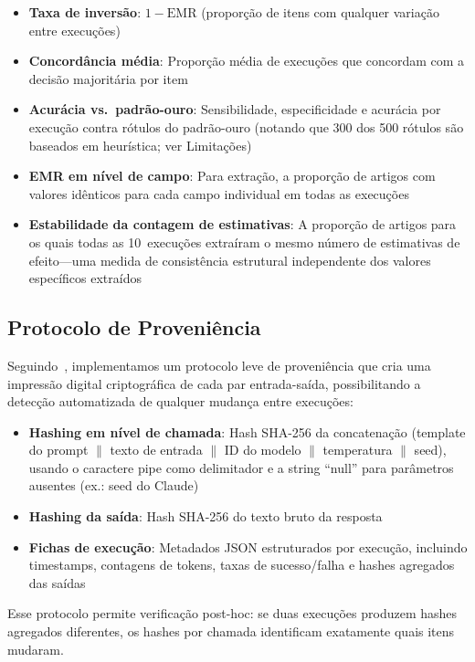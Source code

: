 \documentclass[12pt, a4paper]{article}
\newcommand{\emr}{\textrm{EMR}}
\begin{document}
\begin{itemize}
  \item \textbf{Taxa de inversão}: $1 - \emr$ (proporção de itens com qualquer variação entre execuções)
  \item \textbf{Concordância média}: Proporção média de execuções que concordam com a decisão majoritária por item
  \item \textbf{Acurácia vs.\ padrão-ouro}: Sensibilidade, especificidade e acurácia por execução contra rótulos do padrão-ouro (notando que 300 dos 500 rótulos são baseados em heurística; ver Limitações)
  \item \textbf{EMR em nível de campo}: Para extração, a proporção de artigos com valores idênticos para cada campo individual em todas as execuções
  \item \textbf{Estabilidade da contagem de estimativas}: A proporção de artigos para os quais todas as 10~execuções extraíram o mesmo número de estimativas de efeito---uma medida de consistência estrutural independente dos valores específicos extraídos
\end{itemize}

\subsection{Protocolo de Proveniência}

Seguindo~\citet{rover2026jair}, implementamos um protocolo leve de proveniência que cria uma impressão digital criptográfica de cada par entrada-saída, possibilitando a detecção automatizada de qualquer mudança entre execuções:
\begin{itemize}
  \item \textbf{Hashing em nível de chamada}: Hash SHA-256 da concatenação (template do prompt $\|$ texto de entrada $\|$ ID do modelo $\|$ temperatura $\|$ seed), usando o caractere pipe como delimitador e a string ``null'' para parâmetros ausentes (ex.: seed do Claude)
  \item \textbf{Hashing da saída}: Hash SHA-256 do texto bruto da resposta
  \item \textbf{Fichas de execução}: Metadados JSON estruturados por execução, incluindo timestamps, contagens de tokens, taxas de sucesso/falha e hashes agregados das saídas
\end{itemize}

\noindent Esse protocolo permite verificação post-hoc: se duas execuções produzem hashes agregados diferentes, os hashes por chamada identificam exatamente quais itens mudaram.
\end{document}
